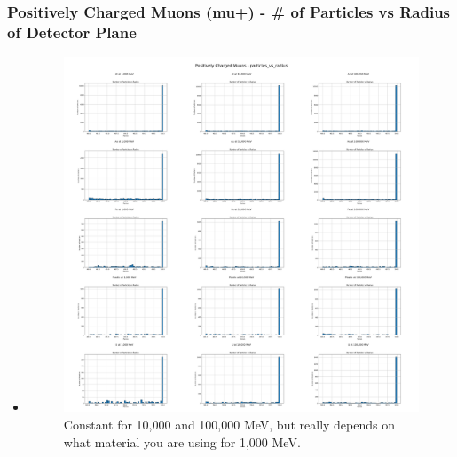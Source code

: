 \documentclass[aspectratio-169]{beamer}
\begin{document}
\begin{frame}
\frametitle{Positively Charged Muons (mu+) - \# of Particles vs Radius of Detector Plane}
\begin{itemize}
    \item 
    \begin{minipage}{0.5\textwidth}
        \begin{figure}
            \centering
            \includegraphics[width=\textwidth]{Combined Plots/particles_vs_radius_mu+.png}
            \footnotesize{Constant for 10,000 and 100,000 MeV, but really depends on what material you are using for 1,000 MeV.}
        \end{figure}
    \end{minipage}
\end{itemize}
\end{frame}

\end{document}
